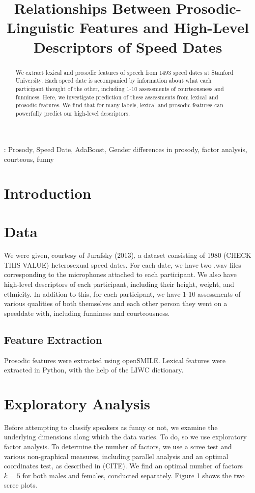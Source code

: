 \documentclass[a4paper]{article}
\title{Relationships Between Prosodic-Linguistic Features and High-Level Descriptors of Speed Dates}
\begin{document}
\maketitle
%

\begin{abstract}
We extract lexical and prosodic features of speech from 1493 speed dates at Stanford University.  Each speed date is accompanied by information about what each participant thought of the other, including 1-10 assessments of courteousness and funniness.  Here, we investigate prediction of these assessments from lexical and prosodic features.  We find that for many labels, lexical and prosodic features can powerfully predict our high-level descriptors.
\end{abstract}

: Prosody, Speed Date, AdaBoost, Gender differences in prosody, factor analysis, courteous, funny

%

\section{Introduction}


\section{Data}
We were given, courtesy of Jurafsky (2013), a dataset consisting of 1980 (CHECK THIS VALUE) heterosexual speed dates. For each date, we have two .wav files corresponding to the microphones attached to each participant.  We also have high-level descriptors of each participant, including their height, weight, and ethnicity.  In addition to this, for each participant, we have 1-10 assessments of various qualities of both themselves and each other person they went on a speeddate with, including funniness and courteousness.

\subsection{Feature Extraction}
Prosodic features were extracted using openSMILE.  Lexical features were extracted in Python, with the help of the LIWC dictionary.  

\section{Exploratory Analysis}
Before attempting to classify speakers as funny or not, we examine the underlying dimensions along which the data varies.  To do, so we use exploratory factor analysis. To determine the number of factors, we use a scree test and various non-graphical measures, including parallel analysis and an optimal coordinates test, as described in (CITE).  We find an optimal number of factors $k = 5$ for both males and females, conducted separately.  Figure 1 shows the two scree plots.
\end{document}
